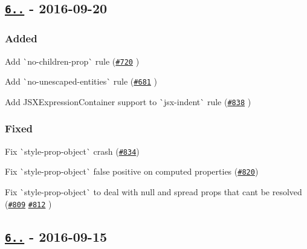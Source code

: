 \subsection*{\href{https://github.com/yannickcr/eslint-plugin-react/compare/v6.2.2...v6.3.0}{\tt 6..} -\/ 2016-\/09-\/20}

\subsubsection*{Added}


\begin{DoxyItemize}
\item Add \`{}no-\/children-\/prop\`{} rule (\href{https://github.com/yannickcr/eslint-plugin-react/issues/720}{\tt \#720} )
\item Add \`{}no-\/unescaped-\/entities\`{} rule (\href{https://github.com/yannickcr/eslint-plugin-react/pull/681}{\tt \#681} )
\item Add J\+S\+X\+Expression\+Container support to \`{}jsx-\/indent\`{} rule (\href{https://github.com/yannickcr/eslint-plugin-react/pull/838}{\tt \#838} )
\end{DoxyItemize}

\subsubsection*{Fixed}


\begin{DoxyItemize}
\item Fix \`{}style-\/prop-\/object\`{} crash (\href{https://github.com/yannickcr/eslint-plugin-react/issues/834}{\tt \#834})
\item Fix \`{}style-\/prop-\/object\`{} false positive on computed properties (\href{https://github.com/yannickcr/eslint-plugin-react/issues/820}{\tt \#820})
\item Fix \`{}style-\/prop-\/object\`{} to deal with null and spread props that can\textquotesingle{}t be resolved (\href{https://github.com/yannickcr/eslint-plugin-react/issues/809}{\tt \#809} \href{https://github.com/yannickcr/eslint-plugin-react/issues/812}{\tt \#812} )
\end{DoxyItemize}

\subsection*{\href{https://github.com/yannickcr/eslint-plugin-react/compare/v6.2.1...v6.2.2}{\tt 6..} -\/ 2016-\/09-\/15}


